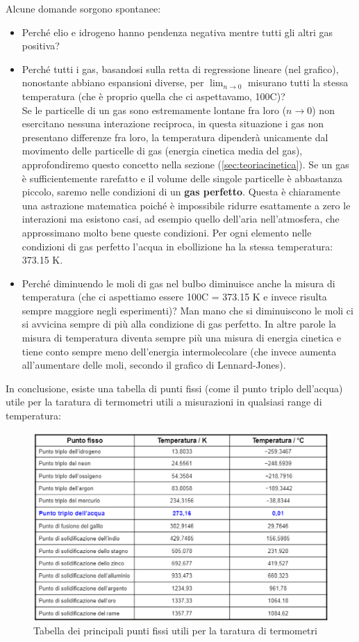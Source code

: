 \documentclass[
10pt, %
a4paper, %
oneside, %
headinclude,footinclude, %
BCOR5mm, %
]{scrartcl}
\begin{document}
\FloatBarrier
Alcune domande sorgono spontanee:
\begin{itemize}
	\item Perché elio e idrogeno hanno pendenza negativa mentre tutti gli altri gas positiva?\\
	
	\item Perché tutti i gas, basandosi sulla retta di regressione lineare (nel grafico), nonostante abbiano espansioni diverse, per $\lim_{n \to 0}$ misurano tutti la stessa temperatura (che è proprio quella che ci aspettavamo, 100\textdegree C)? \\
	Se le particelle di un gas sono estremamente lontane fra loro ($n \to 0$) non esercitano nessuna interazione reciproca, in questa situazione i gas non presentano differenze fra loro, la temperatura dipenderà unicamente dal movimento delle particelle di gas (energia cinetica media del gas), approfondiremo questo concetto nella sezione (\ref{sec:teoriacinetica}). Se un gas è sufficientemente rarefatto e il volume delle singole particelle è abbastanza piccolo, saremo nelle condizioni di un \textbf{gas perfetto}. Questa è chiaramente una astrazione matematica poiché è impossibile ridurre esattamente a zero le interazioni ma esistono casi, ad esempio quello dell'aria nell'atmosfera, che approssimano molto bene queste condizioni. Per ogni elemento nelle condizioni di gas perfetto l'acqua in ebollizione ha la stessa temperatura: 373.15 \textdegree K.
	\item Perché diminuendo le moli di gas nel bulbo diminuisce anche la misura di temperatura (che ci aspettiamo essere 100\textdegree C = 373.15 \textdegree K e invece risulta sempre maggiore negli esperimenti)? 
	Man mano che si diminuiscono le moli ci si avvicina sempre di più alla condizione di gas perfetto. In altre parole la misura di temperatura diventa sempre più una misura di energia cinetica e tiene conto sempre meno dell'energia intermolecolare (che invece aumenta all'aumentare delle moli, secondo il grafico di Lennard-Jones).
\end{itemize}
In conclusione, esiste una tabella di punti fissi (come il punto triplo dell'acqua) utile per la taratura di termometri utili a misurazioni in qualsiasi range di temperatura:
\begin{figure}[h!]
	\centering
	\includegraphics[width=0.7\linewidth]{../images/Punti_fissi}
	\caption{Tabella dei principali punti fissi utili per la taratura di termometri}
	\label{fig:puntifissi}
\end{figure}
\end{document}
